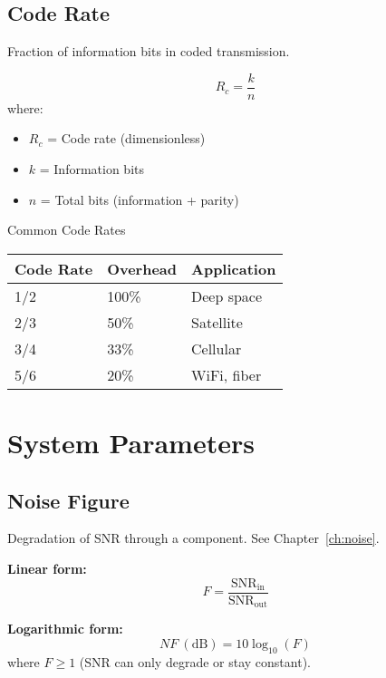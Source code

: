 \subsection{Code Rate}
\label{sec:code-rate}

Fraction of information bits in coded transmission.

\begin{equation}
R_c = \frac{k}{n}
\label{eq:code-rate}
\end{equation}
where:
\begin{itemize}
\item $R_c$ = Code rate (dimensionless)
\item $k$ = Information bits
\item $n$ = Total bits (information + parity)
\end{itemize}

\begin{calloutbox}{Common Code Rates}
\begin{tabular}{@{}lll@{}}
\toprule
Code Rate & Overhead & Application \\
\midrule
1/2 & 100\% & Deep space \\
2/3 & 50\% & Satellite \\
3/4 & 33\% & Cellular \\
5/6 & 20\% & WiFi, fiber \\
\bottomrule
\end{tabular}
\end{calloutbox}

\section{System Parameters}
\label{sec:system-parameters}

\subsection{Noise Figure}
\label{sec:noise-figure}

Degradation of SNR through a component. See Chapter~\ref{ch:noise}.

\textbf{Linear form:}
\begin{equation}
F = \frac{\text{SNR}_{\text{in}}}{\text{SNR}_{\text{out}}}
\label{eq:noise-figure}
\end{equation}

\textbf{Logarithmic form:}
\begin{equation}
NF\ (\text{dB}) = 10\log_{10}(F)
\label{eq:noise-figure-db}
\end{equation}
where $F \geq 1$ (SNR can only degrade or stay constant).

